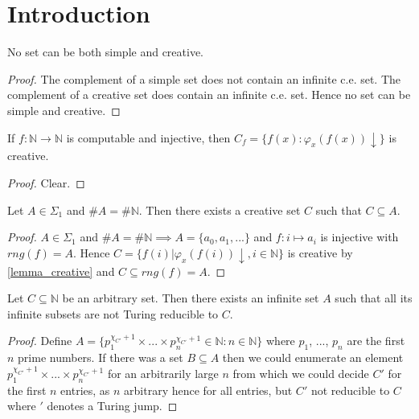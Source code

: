 \chapter{Introduction}

\begin{proposition}
No set can be both simple and creative.
\end{proposition}

\begin{proof}
The complement of a simple set does not contain an infinite c.e. set. The complement of a creative set does contain an infinite c.e. set. Hence no set can be simple and creative.
\end{proof}

\begin{lemma}\label{lemma_creative}
If $f : \mathbb{N} \to \mathbb{N}$ is computable and injective, then $C_f = \{f(x) : \varphi_x(f(x))\downarrow \}$ is creative.
\end{lemma}
\begin{proof}
Clear.
\end{proof}

\begin{proposition}
Let $A \in \Sigma_1$ and $\#A = \#\mathbb{N}$. Then there exists a creative set $C$ such that $C \subseteq A$.
\end{proposition}

\begin{proof}
$A \in \Sigma_1$ and $\#A = \#\mathbb{N} \implies A=\{a_0, a_1, ... \}$ and $f:i \mapsto a_i$ is injective with $rng(f)=A$. 
Hence $C=\{f(i) | \varphi_x(f(i))\downarrow, i \in \mathbb{N}\}$ is creative by \autoref{lemma_creative} and $C \subseteq	 rng(f) = A$.
\end{proof}

\begin{lemma}
Let $C \subseteq \mathbb{N}$ be an arbitrary set. Then there exists an infinite set $A$ such that all its infinite subsets are not Turing reducible to $C$.
\end{lemma}
\begin{proof}
Define $A=\{p_1^{\chi_{C'}+1}\times...\times p_n^{\chi_{C'}+1} \in \mathbb{N} : n \in \mathbb{N}\}$ where $p_1$, ..., $p_n$ are the first $n$ prime numbers.
If there was a set $B \subseteq A$ then we could enumerate an element $p_1^{\chi_{C'}+1}\times...\times p_n^{\chi_{C'}+1}$ for an arbitrarily large $n$ from which we could decide $C'$ for the first $n$ entries, as $n$ arbitrary hence for all entries, but $C'$ not reducible to $C$ where $'$ denotes a Turing jump.
\end{proof}




